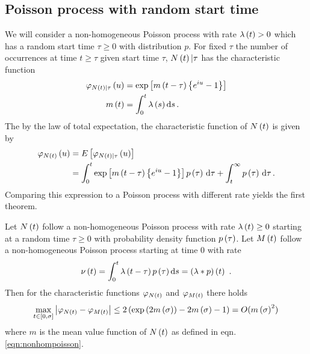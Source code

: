\documentclass{amsart}
\numberwithin{equation}{section}
\begin{document}
\subsection{Poisson process with random start time}
We will consider a non-homogeneous Poisson process with rate $\lambda\left(t\right) > 0$ which has a random start time $\tau \geq 0$ with distribution $p$. For fixed $\tau$ the number of occurrences at time $t \geq \tau$ given start time $\tau$, $N\left(t\right) \vert \tau$ has the characteristic function \cite[chapter 4, eqn. (2.1)]{parzen1962stochastic}
\begin{align}\label{eqn:nonhompoisson}
\begin{split}
\varphi_{N\left(t\right) \vert \tau}\left(u\right) &= \exp\left[m\left(t - \tau\right) \left\{e^{i u} - 1\right\}\right] \\
m\left(t\right) &= \int_0^t \lambda\left(s\right) \mathrm{d}s \, .
\end{split}
\end{align}
The by the law of total expectation, the characteristic function of $N\left(t\right)$ is given by
\begin{align*}
\varphi_{N\left(t\right)}\left(u\right) &= E\left[\varphi_{N\left(t\right) \vert \tau}\left(u\right)\right] \\
&=\int_0^t \exp\left[m\left(t - \tau\right) \left\{e^{i u} - 1\right\}\right] p \left(\tau\right) \, \mathrm{d}\tau + \int_t^\infty p \left(\tau\right) \, \mathrm{d}\tau \, .
\end{align*}
Comparing this expression to a Poisson process with different rate yields the first theorem.
\begin{theorem}\label{thm:iteratedpoisson}
Let $N\left(t\right)$ follow a non-homogeneous Poisson process with rate $\lambda\left(t\right) \geq 0$ starting at a random time $\tau \geq 0$ with probability density function $p\left(\tau\right)$. Let $M\left(t\right)$ follow a non-homogeneous Poisson process starting at time $0$ with rate
\begin{equation}
\nu\br{t} = \int_0^t\lambda\br{t-\tau} p\br{\tau} \ds = \br{\lambda \ast p}\br{t} \ .
\end{equation}
Then for the characteristic functions $\varphi_{N\left(t\right)}$ and $\varphi_{M\left(t\right)}$ there holds
\begin{equation}
\max_{t \in \left[0, \sigma\right]} \left|\varphi_{N\left(t\right)} - \varphi_{M\left(t\right)}\right|
\leq 2 \left(\exp\left(2 m\left(\sigma\right)\right) - 2m\left(\sigma\right) - 1\right)
= O (m\left(\sigma\right)^2) \,
\end{equation}
where $m$ is the mean value function of $N\left(t\right)$ as defined in eqn. \eqref{eqn:nonhompoisson}.
\end{theorem}
\end{document}
